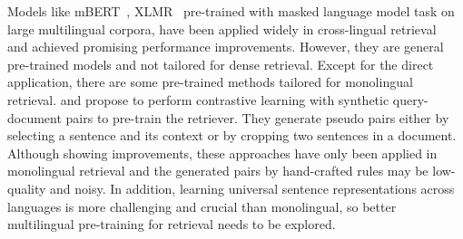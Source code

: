 \documentclass{article} %
\begin{document}
Models like mBERT~\citep{bert2019}, XLMR~\citep{conneau2019unsupervised} pre-trained with masked language model task on large multilingual corpora, have been applied widely in cross-lingual retrieval~\citep{asai-etal-2021-xor, asai2021one, shi-etal-2021-cross} and achieved promising performance improvements. However, they are general pre-trained models and not tailored for dense retrieval. 
Except for the direct application, there are some pre-trained methods tailored for monolingual retrieval. \citet{lee-etal-2019-latent} and \citet{gao2021cocondenser} propose to perform contrastive learning with synthetic query-document pairs to pre-train the retriever. They generate pseudo pairs either by selecting a sentence and its context or by cropping two sentences in a document. Although showing improvements, these approaches have only been applied in monolingual retrieval and the generated pairs by hand-crafted rules may be low-quality and noisy. In addition, learning universal sentence representations across languages is more challenging and crucial than monolingual, so better multilingual pre-training for retrieval needs to be explored.






\end{document}
